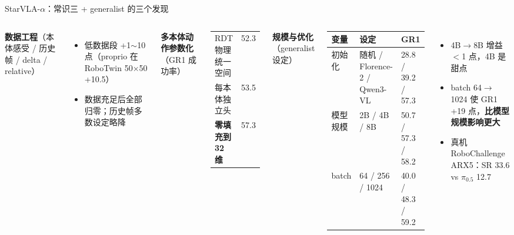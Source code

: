 \documentclass[aspectratio=169,10pt]{beamer}
\newcommand{\pos}[1]{\textcolor{positive}{#1}}
\newcommand{\con}[1]{\textcolor{negative}{#1}}
\newcommand{\HL}[1]{\textcolor{emphasis}{#1}}
\begin{document}
\begin{frame}{StarVLA-$\alpha$：常识三 + generalist 的三个发现}
  \begin{columns}[T]
    \textbf{数据工程}（本体感受 / 历史帧 / delta / relative）
    \begin{itemize}
      \item 低数据段 +1$\sim$10 点（proprio 在 RoboTwin 50$\times$50 +10.5）
      \item 数据充足后全部归零；\con{历史帧多数设定略降}
    \end{itemize}
    \vspace{4pt}
    \textbf{多本体动作参数化}（GR1 成功率）
    \begin{center}\footnotesize
    \begin{tabular}{lr}
      \toprule
      RDT 物理统一空间 & 52.3 \\
      每本体独立头 & 53.5 \\
      \textbf{零填充到 32 维} & \HL{57.3} \\
      \bottomrule
    \end{tabular}
    \end{center}
    \textbf{规模与优化}（generalist 设定）
    \begin{center}\footnotesize
    \begin{tabular}{p{1.2cm}p{2.7cm}p{2.3cm}}
      \toprule
      变量 & 设定 & GR1 \\
      \midrule
      初始化 & 随机 / Florence-2 / Qwen3-VL & 28.8 / 39.2 / 57.3 \\
      模型规模 & 2B / 4B / 8B & 50.7 / 57.3 / 58.2 \\
      batch & 64 / 256 / 1024 & 40.0 / 48.3 / \HL{59.2} \\
      \bottomrule
    \end{tabular}
    \end{center}
    \begin{itemize}
      \item 4B$\to$8B 增益 $<$1 点，\pos{4B 是甜点}
      \item batch 64$\to$1024 使 GR1 +19 点，\textbf{比模型规模影响更大}
      \item 真机 RoboChallenge ARX5：SR 33.6 vs $\pi_{0.5}$ 12.7
    \end{itemize}
  \end{columns}
\end{frame}
\end{document}
